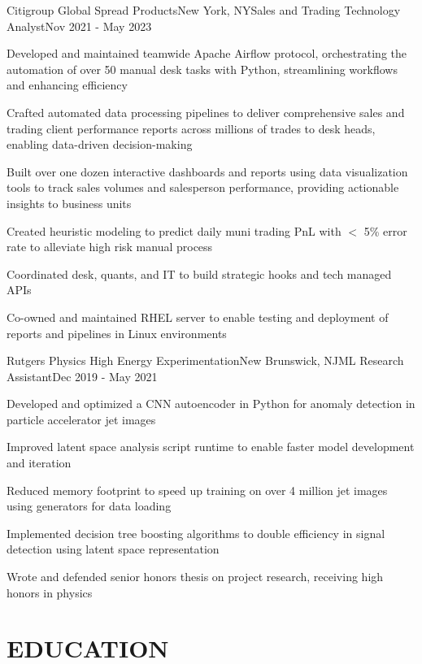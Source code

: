 \documentclass[pdftitle={Michael Tran Resume},pdfauthor={Michael Tran}]{resume}
\begin{document}
\begin{experience}{Citigroup Global Spread Products}{New York, NY}{Sales and Trading Technology Analyst}{Nov 2021 - May 2023}
    \item Developed and maintained teamwide Apache Airflow protocol, orchestrating the automation of over 50 manual desk tasks with Python, streamlining workflows and enhancing efficiency
    \item Crafted automated data processing pipelines to deliver comprehensive sales and trading client performance reports across millions of trades to desk heads, enabling data-driven decision-making
    \item Built over one dozen interactive dashboards and reports using data visualization tools to track sales volumes and salesperson performance, providing actionable insights to business units
    \item Created heuristic modeling to predict daily muni trading PnL with $<$ 5\% error rate to alleviate high risk manual process
    \item Coordinated desk, quants, and IT to build strategic hooks and tech managed APIs
    \item Co-owned and maintained RHEL server to enable testing and deployment of reports and pipelines in Linux environments
\end{experience}

\begin{experience}{Rutgers Physics High Energy Experimentation}{New Brunswick, NJ}{ML Research Assistant}{Dec 2019 - May 2021}
    \item Developed and optimized a CNN autoencoder in Python for anomaly detection in particle accelerator jet images
    \item Improved latent space analysis script runtime to enable faster model development and iteration
    \item Reduced memory footprint to speed up training on over 4 million jet images using generators for data loading
    \item Implemented decision tree boosting algorithms to double efficiency in signal detection using latent space representation
    \item Wrote and defended senior honors thesis on project research, receiving high honors in physics
\end{experience}

\separator

\section{EDUCATION}
\end{document}
